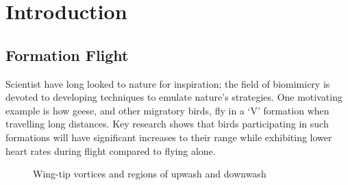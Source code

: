 \chapter{Introduction}\label{chapter:1}


\section{Formation Flight}
	Scientist have long looked to nature for inspiration; the field of biomimicry is devoted to developing techniques to emulate nature's strategies. One motivating example is how geese, and other migratory birds, fly in a `V' formation \cite{Gould1974,Hainsworth1989,Cutts1994,Weimerskirch2001,Portugal2014} when travelling long distances. Key research shows that birds participating in such formations will have significant increases to their range \cite{Lissaman1970,Cutts1994} while exhibiting lower heart rates \cite{Weimerskirch2001} during flight compared to flying alone. 


		\begin{figure}[ht]
		\centering
		\caption[Wing-tip vortices and regions of upwash and downwash]{Wing-tip vortices and regions of upwash and downwash}\label{fig:vortices}
		\end{figure}

